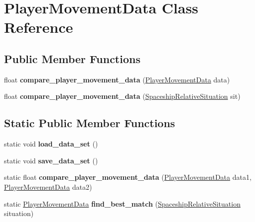 \hypertarget{class_player_movement_data}{}\section{Player\+Movement\+Data Class Reference}
\label{class_player_movement_data}
\subsection*{Public Member Functions}
\begin{DoxyCompactItemize}
\item 
\mbox{\label{class_player_movement_data_a556692307eab67f2528d6edc75ee255e}} 
float {\bfseries compare\+\_\+player\+\_\+movement\+\_\+data} (\hyperlink{class_player_movement_data}{Player\+Movement\+Data} data)
\item 
\mbox{\label{class_player_movement_data_adf2202ac5170a973c9c1b97912dbb729}} 
float {\bfseries compare\+\_\+player\+\_\+movement\+\_\+data} (\hyperlink{struct_spaceship_relative_situation}{Spaceship\+Relative\+Situation} sit)
\end{DoxyCompactItemize}
\subsection*{Static Public Member Functions}
\begin{DoxyCompactItemize}
\item 
\mbox{\label{class_player_movement_data_aa9fa3555b33a189ce426a49879af54bd}} 
static void {\bfseries load\+\_\+data\+\_\+set} ()
\item 
\mbox{\label{class_player_movement_data_ae81023938fbf2a0ce9491dd96820bb62}} 
static void {\bfseries save\+\_\+data\+\_\+set} ()
\item 
\mbox{\label{class_player_movement_data_ace02d521d186f7d02a74303334c73b27}} 
static float {\bfseries compare\+\_\+player\+\_\+movement\+\_\+data} (\hyperlink{class_player_movement_data}{Player\+Movement\+Data} data1, \hyperlink{class_player_movement_data}{Player\+Movement\+Data} data2)
\item 
\mbox{\label{class_player_movement_data_aa732dca43740f2acfac56b44e0ea8867}} 
static \hyperlink{class_player_movement_data}{Player\+Movement\+Data} {\bfseries find\+\_\+best\+\_\+match} (\hyperlink{struct_spaceship_relative_situation}{Spaceship\+Relative\+Situation} situation)
\end{DoxyCompactItemize}
